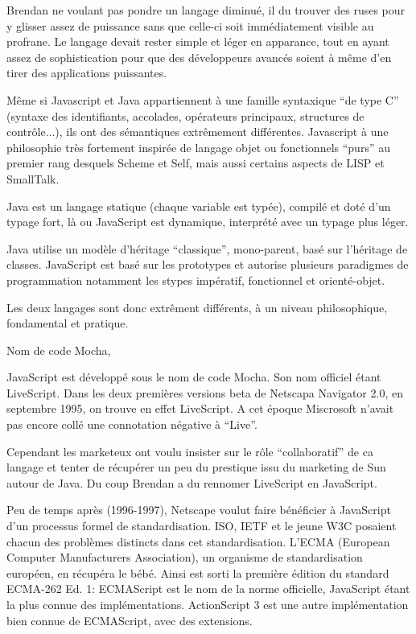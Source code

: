 Brendan ne voulant pas pondre un langage diminué, il du trouver des ruses pour y glisser assez de puissance sans que celle-ci soit immédiatement visible au profrane. Le langage devait rester simple et léger en apparance, tout en ayant assez de sophistication pour que des développeurs avancés soient à même d’en tirer des applications puissantes.

Même si Javascript et Java appartiennent à une famille syntaxique “de type C” (syntaxe des identifiants, accolades, opérateurs principaux, structures de contrôle...), ils ont des sémantiques extrêmement différentes. Javascript à une philosophie très fortement inspirée de langage objet ou fonctionnels “purs” au premier rang desquels Scheme et Self, mais aussi certains aspects de LISP et SmallTalk.

Java est un langage statique (chaque variable est typée), compilé et doté d’un typage fort, là ou JavaScript est dynamique, interprété avec un typage plus léger.

Java utilise un modèle d’héritage “classique”, mono-parent, basé sur l’héritage de classes. JavaScript est basé sur les prototypes et autorise plusieurs paradigmes de programmation notamment les stypes impératif, fonctionnel et orienté-objet.

Les deux langages sont donc extrêment différents, à un niveau philosophique, fondamental et pratique.

Nom de code Mocha,

JavaScript est développé sous le nom de code Mocha. Son nom officiel étant LiveScript. Dans les deux premières versions beta de Netscapa Navigator 2.0, en septembre 1995, on trouve en effet LiveScript. A cet époque Miscrosoft n’avait pas encore collé une connotation négative à “Live”.

Cependant les marketeux ont voulu insister sur le rôle “collaboratif” de ca langage et tenter de récupérer un peu du prestique issu du marketing de Sun autour de Java. Du coup Brendan a du rennomer LiveScript en JavaScript.

Peu de temps après (1996-1997), Netscape voulut faire bénéficier à JavaScript d’un processus formel de standardisation. ISO, IETF et le jeune W3C posaient chacun des problèmes distincts dans cet standardisation. L’ECMA (European Computer Manufacturers Association), un organisme de standardisation européen, en récupéra le bébé. Ainsi est sorti la première édition du standard ECMA-262 Ed. 1: ECMAScript est le nom de la norme officielle, JavaScript étant la plus connue des implémentations. ActionScript 3 est une autre implémentation bien connue de ECMAScript, avec des extensions.


